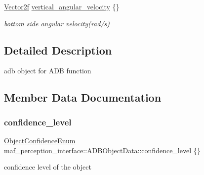 \begin{DoxyCompactItemize}
\hyperlink{structmaf__perception__interface_1_1Vector2f}{Vector2f} \hyperlink{structmaf__perception__interface_1_1ADBObjectData_ac61ecf1747162b7a65841d3838a8014e}{vertical\+\_\+angular\+\_\+velocity} \{\}
\begin{DoxyCompactList}\small\item\em bottom side angular velocity(rad/s) \end{DoxyCompactList}\end{DoxyCompactItemize}


\subsection{Detailed Description}
adb object for A\+DB function 

\subsection{Member Data Documentation}
\mbox{\label{structmaf__perception__interface_1_1ADBObjectData_adc1c8476533cffb5d2cf6c02cc802624}} 
\subsubsection{\texorpdfstring{confidence\+\_\+level}{confidence\_level}}
{\footnotesize\ttfamily \hyperlink{structmaf__perception__interface_1_1ObjectConfidenceEnum}{Object\+Confidence\+Enum} maf\+\_\+perception\+\_\+interface\+::\+A\+D\+B\+Object\+Data\+::confidence\+\_\+level \{\}}



confidence level of the object 

\mbox{\label{structmaf__perception__interface_1_1ADBObjectData_ac8cc9c84af4a0ab479bbfe4424bec58b}} 
